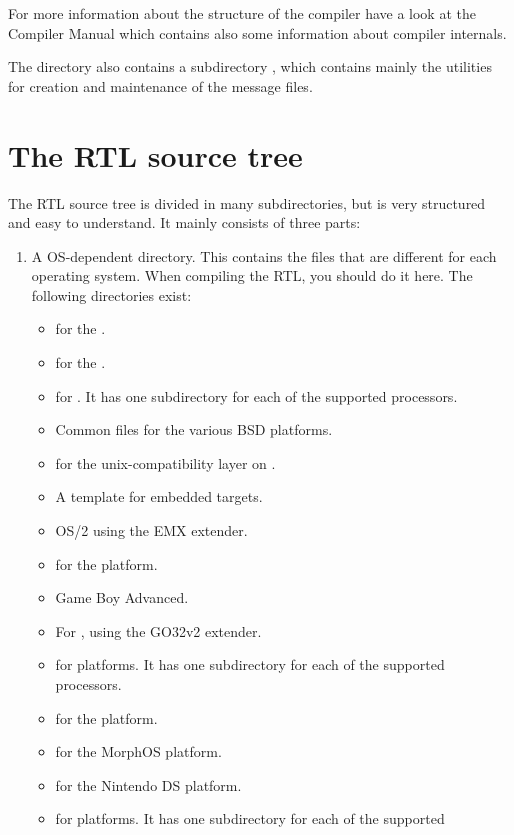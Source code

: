 For more information about the structure of the compiler have a look at the
Compiler Manual which contains also some information about
compiler internals.

The  directory also contains a subdirectory ,
which contains mainly the utilities for creation and maintenance of the
message files.

\section{The RTL source tree}
The RTL source tree is divided in many subdirectories, but is very
structured and easy to understand. It mainly consists of three parts:

\begin{enumerate}
\item A OS-dependent directory. This contains the files that are different for
each operating system. When compiling the RTL, you should do it here. The
following directories exist:
\begin{itemize}
\item {} for the \amiga.
\item {} for the \atari.
\item {}  for \beos. 
It has one subdirectory for each of the supported processors.
\item {} Common files for the various BSD platforms.
\item {} for the unix-compatibility layer on \macos.
\item {} A template for embedded targets.
\item {} OS/2 using the EMX extender.
\item {} for the \freebsd platform.
\item {} Game Boy Advanced.
\item {} For \dos, using the GO32v2 extender.
\item {} for \linux platforms. It has one subdirectory for each of the supported
processors.
\item {} for the \macos platform. 
\item {} for the MorphOS platform. 
\item {} for the Nintendo DS platform.
\item {} for \netbsd platforms. It has one subdirectory for each of the supported

\end{itemize}
\end{enumerate}
